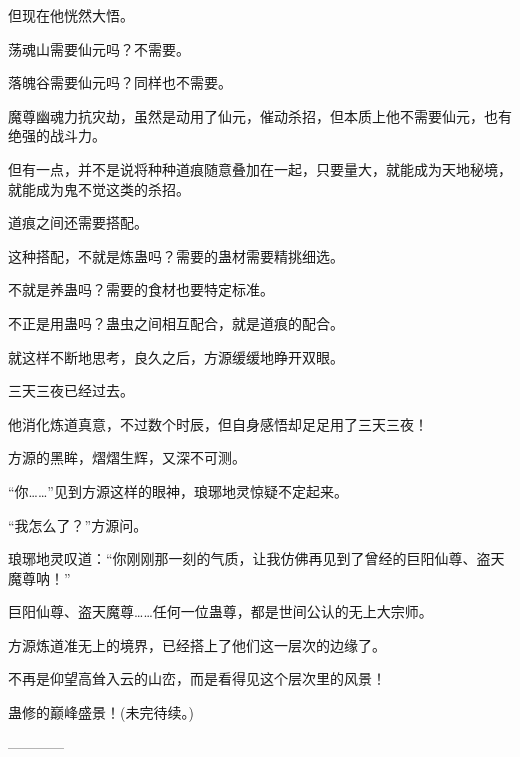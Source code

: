 \begin{this_body}
但现在他恍然大悟。

荡魂山需要仙元吗？不需要。

落魄谷需要仙元吗？同样也不需要。

魔尊幽魂力抗灾劫，虽然是动用了仙元，催动杀招，但本质上他不需要仙元，也有绝强的战斗力。

但有一点，并不是说将种种道痕随意叠加在一起，只要量大，就能成为天地秘境，就能成为鬼不觉这类的杀招。

道痕之间还需要搭配。

这种搭配，不就是炼蛊吗？需要的蛊材需要精挑细选。

不就是养蛊吗？需要的食材也要特定标准。

不正是用蛊吗？蛊虫之间相互配合，就是道痕的配合。

就这样不断地思考，良久之后，方源缓缓地睁开双眼。

三天三夜已经过去。

他消化炼道真意，不过数个时辰，但自身感悟却足足用了三天三夜！

方源的黑眸，熠熠生辉，又深不可测。

“你……”见到方源这样的眼神，琅琊地灵惊疑不定起来。

“我怎么了？”方源问。

琅琊地灵叹道：“你刚刚那一刻的气质，让我仿佛再见到了曾经的巨阳仙尊、盗天魔尊呐！”

巨阳仙尊、盗天魔尊……任何一位蛊尊，都是世间公认的无上大宗师。

方源炼道准无上的境界，已经搭上了他们这一层次的边缘了。

不再是仰望高耸入云的山峦，而是看得见这个层次里的风景！

蛊修的巅峰盛景！(未完待续。)

------------

\end{this_body}

